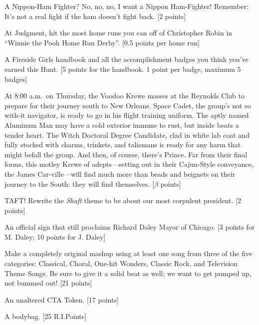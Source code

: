 \documentclass{book}
\begin{document}
\begin{list}{}{}
\item A Nippon-Ham Fighter? No, no, no, I want a Nippon Ham-Fighter! Remember: It's not a real fight if the ham doesn't fight back. [2 points]

\item  At Judgment, hit the most home runs you can off of Christopher Robin in ``Winnie the Pooh Home Run Derby''. [0.5 points per home run]

\item A Fireside Girls handbook and all the accomplishment badges you think you've earned this Hunt. [5 points for the handbook. 1 point per badge, maximum 5 badges]

\item  At 8:00 a.m.\ on Thursday, the Voodoo Krewe masses at the Reynolds Club to prepare for their journey south to New Orleans.  Space Cadet, the group's not so with-it navigator, is ready to go in his flight training uniform. The aptly named Aluminum Man may have a cold exterior immune to rust, but inside beats a tender heart.  The Witch Doctoral Degree Candidate, clad in white lab coat and fully stocked with charms, trinkets, and talismans is ready for any harm that might befall the group.  And then, of course, there's Prince.  Far from their final forms, this motley Krewe of adepts---setting out in their Cajun-Style conveyance, the James Car-ville---will find much more than beads and beignets on their journey to the South: they will find themselves. [$\beta$ points]

\item TAFT! Rewrite the \emph{Shaft} theme to be about our most corpulent president. [2 points]

\item An official sign that still proclaims Richard Daley Mayor of Chicago. [3 points for M. Daley; 10 points for J. Daley]

\item Make a completely original mashup using at least one song from three of the five categories: Classical, Choral, One-hit Wonders, Classic Rock, and Television Theme Songs. Be sure to give it a solid beat as well; we want to get pumped up, not bummed out! [21 points]

\item An unaltered CTA Token. [17 points]

\item A bodybag. [25 R.I.Points]

\newpage



\end{list}
\end{document}

